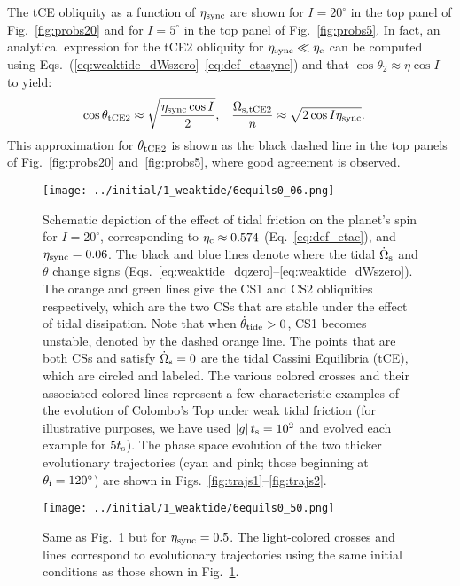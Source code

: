 \documentclass[
        fleqn,
        usenatbib,
        referee,
    ]{mnras}
\newcommand*{\abs}[1]{\left|#1\right|}
\begin{document}
The tCE obliquity as a function of $\eta_{\rm sync}$ are shown for $I =
20^\circ$ in the top panel of Fig.~\ref{fig:probs20} and for $I = 5^\circ$ in
the top panel of Fig.~\ref{fig:probs5}. In fact, an analytical expression for
the tCE2 obliquity for $\eta_{\rm sync} \ll \eta_{\rm c}$ can be computed using
Eqs.~(\ref{eq:weaktide_dWszero}--\ref{eq:def_etasync}) and that $\cos \theta_2
\approx \eta \cos I$ to yield:
\begin{align}
    \cos \theta_{\rm tCE2} &\approx \sqrt{\frac{\eta_{\rm sync} \cos I}{2}},
        &
    \frac{\Omega_{\rm s, tCE2}}{n} &\approx
        \sqrt{2\cos I \eta_{\rm sync}}. \label{eq:def_tce2_approx}
\end{align}
This approximation for $\theta_{\rm tCE2}$ is shown as the black dashed line in
the top panels of Fig.~\ref{fig:probs20} and~\ref{fig:probs5}, where good
agreement is observed.
\begin{figure*}
    \centering
    \texttt{[image: ../initial/1\_weaktide/6equils0\_06.png]}
    \caption{Schematic depiction of the effect of tidal friction on the planet's
    spin for $I = 20^\circ$, corresponding to $\eta_{\rm c} \approx 0.574$
    (Eq.~\ref{eq:def_etac}), and $\eta_{\rm sync} = 0.06$. The black and blue
    lines denote where the tidal $\dot{\Omega}_{\rm s}$ and $\dot{\theta}$
    change signs (Eqs.~\ref{eq:weaktide_dqzero}--\ref{eq:weaktide_dWszero}). The
    orange and green lines give the CS1 and CS2 obliquities respectively, which
    are the two CSs that are stable under the effect of tidal dissipation. Note
    that when $\dot{\theta}_{\rm tide} > 0$, CS1 becomes unstable, denoted by
    the dashed orange line. The points that are both CSs and satisfy
    $\dot{\Omega}_{\rm s} = 0$ are the tidal Cassini Equilibria (tCE), which are
    circled and labeled. The various colored crosses and their associated
    colored lines represent a few characteristic examples of the evolution of
    Colombo's Top under weak tidal friction (for illustrative purposes, we have
    used $\abs{g}t_{\rm s} = 10^2$ and evolved each example for $5t_{\rm s}$).
    The phase space evolution of the two thicker evolutionary trajectories (cyan
    and pink; those beginning at $\theta_{\rm i} = 120^\circ$) are shown in
    Figs.~\ref{fig:trajs1}--\ref{fig:trajs2}.
    }\label{fig:6equils006}
\end{figure*}
\begin{figure*}
    \centering
    \texttt{[image: ../initial/1\_weaktide/6equils0\_50.png]}
    \caption{Same as Fig.~\ref{fig:6equils006} but for $\eta_{\rm sync} = 0.5$.
    The light-colored crosses and lines correspond to evolutionary trajectories
    using the same initial conditions as those shown in
    Fig.~\ref{fig:6equils006}.}\label{fig:6equils050}
\end{figure*}
\end{document}
